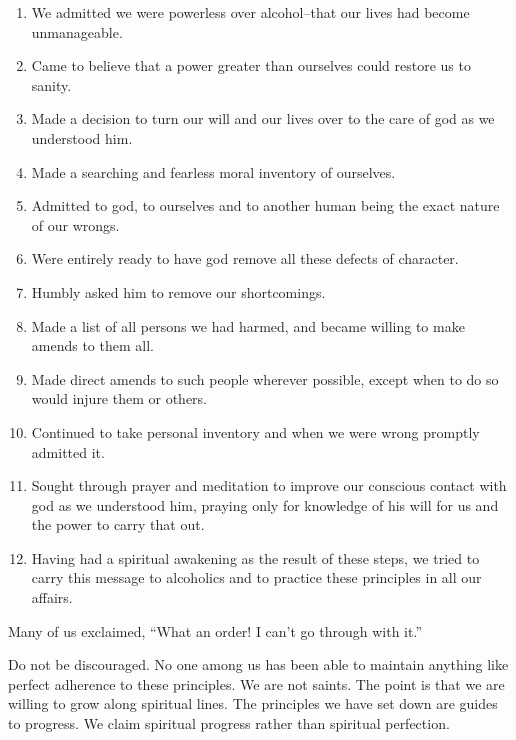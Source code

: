\documentclass{beamer}
\begin{document}
\begin{frame}
    \footnotesize
\begin{enumerate}\setlength{\itemsep}{-2pt}
\item We admitted we were powerless over alcohol--that our lives had become unmanageable. \item   Came  to  believe  that  a  power  greater  than  ourselves  could restore us to sanity. \item  Made a decision to turn our will and our lives over to the care of god as we understood him.\item   Made   a   searching   and   fearless   moral   inventory   of      ourselves. \item   Admitted  to  god,  to  ourselves  and  to  another  human  being the exact nature of our wrongs. \item Were  entirely  ready  to  have  god  remove  all  these    defects of character. \item Humbly asked him to remove our shortcomings. \item   Made  a  list  of  all  persons  we  had  harmed,  and  became  willing to make amends to them all. \item Made  direct  amends  to  such  people  wherever  possible,  except when to do so would injure them or others. \item Continued to take personal inventory and when we were wrong promptly admitted it. \item Sought  through  prayer  and  meditation  to  improve  our  conscious  contact  with  god  as  we  understood  him,  praying  only  for  knowledge  of  his  will  for  us  and  the  power to carry that out. \item Having  had  a  spiritual  awakening  as  the  result  of  these  steps, we tried to carry this message to alcoholics and to practice these principles in all our affairs.
 \end{enumerate}
 
\normalsize
Many of us exclaimed, ``What an order! I can’t go through with it.'' 
\bigskip

 Do  not  be  discouraged.  No  one  among  us  has  been  able  to  maintain  anything  like  perfect  adherence  to  these  principles.  We  are  not  saints.  The  point  is  that  we  are  willing  to  grow  along  spiritual  lines.  The  principles  we  have  set  down  are  guides  to  progress.  We  claim  spiritual  progress  rather  than  spiritual perfection. 
\bigskip


\end{frame}
\end{document}
